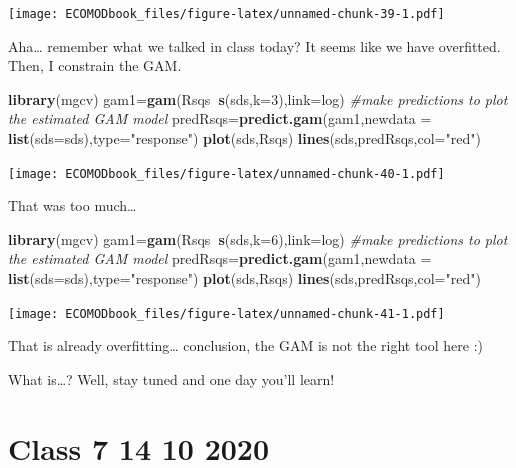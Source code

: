 \documentclass[
]{book}
\newenvironment{Shaded}{\begin{snugshade}}{\end{snugshade}}
\newcommand{\CommentTok}[1]{\textcolor[rgb]{0.56,0.35,0.01}{\textit{#1}}}
\newcommand{\DataTypeTok}[1]{\textcolor[rgb]{0.13,0.29,0.53}{#1}}
\newcommand{\DecValTok}[1]{\textcolor[rgb]{0.00,0.00,0.81}{#1}}
\newcommand{\KeywordTok}[1]{\textcolor[rgb]{0.13,0.29,0.53}{\textbf{#1}}}
\newcommand{\NormalTok}[1]{#1}
\newcommand{\OperatorTok}[1]{\textcolor[rgb]{0.81,0.36,0.00}{\textbf{#1}}}
\newcommand{\StringTok}[1]{\textcolor[rgb]{0.31,0.60,0.02}{#1}}
\begin{document}
\texttt{[image: ECOMODbook\_files/figure-latex/unnamed-chunk-39-1.pdf]}

Aha\ldots{} remember what we talked in class today? It seems like we have overfitted. Then, I constrain the GAM.

\begin{Shaded}
\begin{Highlighting}[]
\KeywordTok{library}\NormalTok{(mgcv)}
\NormalTok{gam1=}\KeywordTok{gam}\NormalTok{(Rsqs}\OperatorTok{~}\KeywordTok{s}\NormalTok{(sds,}\DataTypeTok{k=}\DecValTok{3}\NormalTok{),}\DataTypeTok{link=}\NormalTok{log)}
\CommentTok{#make predictions to plot the estimated GAM model}
\NormalTok{predRsqs=}\KeywordTok{predict.gam}\NormalTok{(gam1,}\DataTypeTok{newdata =} \KeywordTok{list}\NormalTok{(}\DataTypeTok{sds=}\NormalTok{sds),}\DataTypeTok{type=}\StringTok{"response"}\NormalTok{)}
\KeywordTok{plot}\NormalTok{(sds,Rsqs)}
\KeywordTok{lines}\NormalTok{(sds,predRsqs,}\DataTypeTok{col=}\StringTok{"red"}\NormalTok{)}
\end{Highlighting}
\end{Shaded}

\texttt{[image: ECOMODbook\_files/figure-latex/unnamed-chunk-40-1.pdf]}

That was too much\ldots{}

\begin{Shaded}
\begin{Highlighting}[]
\KeywordTok{library}\NormalTok{(mgcv)}
\NormalTok{gam1=}\KeywordTok{gam}\NormalTok{(Rsqs}\OperatorTok{~}\KeywordTok{s}\NormalTok{(sds,}\DataTypeTok{k=}\DecValTok{6}\NormalTok{),}\DataTypeTok{link=}\NormalTok{log)}
\CommentTok{#make predictions to plot the estimated GAM model}
\NormalTok{predRsqs=}\KeywordTok{predict.gam}\NormalTok{(gam1,}\DataTypeTok{newdata =} \KeywordTok{list}\NormalTok{(}\DataTypeTok{sds=}\NormalTok{sds),}\DataTypeTok{type=}\StringTok{"response"}\NormalTok{)}
\KeywordTok{plot}\NormalTok{(sds,Rsqs)}
\KeywordTok{lines}\NormalTok{(sds,predRsqs,}\DataTypeTok{col=}\StringTok{"red"}\NormalTok{)}
\end{Highlighting}
\end{Shaded}

\texttt{[image: ECOMODbook\_files/figure-latex/unnamed-chunk-41-1.pdf]}

That is already overfitting\ldots{} conclusion, the GAM is not the right tool here :)

What is\ldots? Well, stay tuned and one day you'll learn!

\hypertarget{aula7}{%
\chapter{Class 7 14 10 2020}\label{aula7}}
\end{document}
